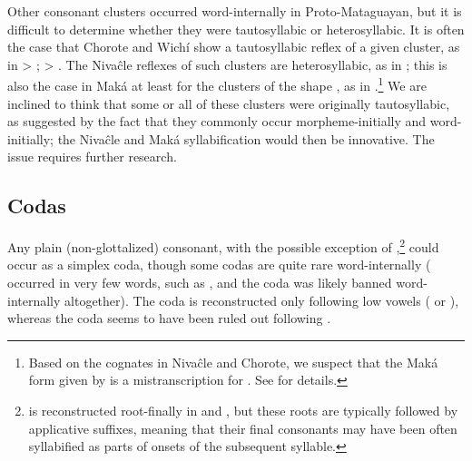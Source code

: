 Other consonant clusters occurred word-internally in Proto-Mataguayan, but it is difficult to determine whether they were tautosyllabic or heterosyllabic. It is often the case that Chorote and Wichí show a tautosyllabic reflex of a given cluster, as in  > ;  > . The Nivaĉle reflexes of such clusters are heterosyllabic, as in  \citep[124]{AnG15}; this is also the case in Maká at least for the clusters of the shape , as in  \citep[21, fn. 3]{AG89}.\footnote{Based on the cognates in Nivaĉle and Chorote, we suspect that the Maká form given by \citet[21, fn. 3]{AG89} is a mistranscription for . See  for details.} We are inclined to think that some or all of these clusters were originally tautosyllabic, as suggested by the fact that they commonly occur morpheme-initially and word-initially; the Nivaĉle and Maká syllabification would then be innovative. The issue requires further research.

\subsection{Codas}\label{codas}

Any plain (non-glottalized) consonant, with the possible exception of ,\footnote{ is reconstructed root-finally in  and , but these roots are typically followed by applicative suffixes, meaning that their final consonants may have been often syllabified as parts of onsets of the subsequent syllable.} could occur as a simplex coda, though some codas are quite rare word-internally ( occurred in very few words, such as , and the coda  was likely banned word-internally altogether). The coda  is reconstructed only following low vowels ( or ), whereas the coda  seems to have been ruled out following .

